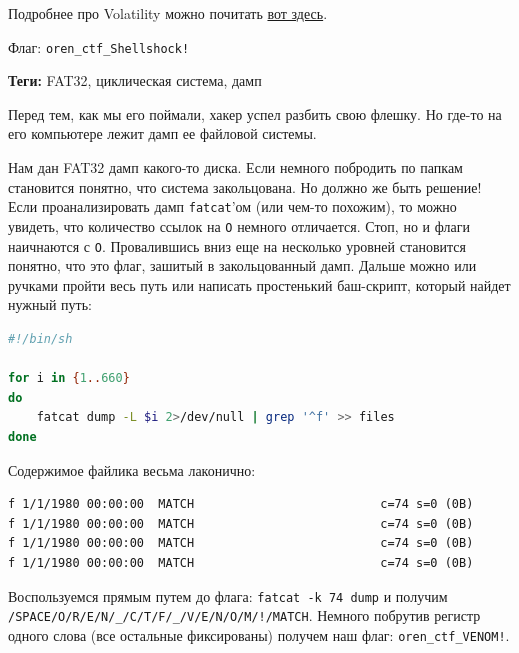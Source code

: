 \documentclass[idxtotoc,hyperref,openany,oneside]{files/forensics} %
\begin{document}
Подробнее про Volatility можно почитать \href{https://habr.com/ru/post/433248/}{вот здесь}.

Флаг: \verb|oren_ctf_Shellshock!|




\textbf{Теги:} FAT32, циклическая система, дамп\vspace{\baselineskip}

\begin{tcolorbox}
Перед тем, как мы его поймали, хакер успел разбить свою флешку. Но где-то на его компьютере лежит дамп ее файловой системы.
\end{tcolorbox}

Нам дан FAT32 дамп какого-то диска. Если немного побродить по папкам становится понятно, что система закольцована. Но должно же быть решение! Если проанализировать дамп \verb|fatcat|'ом (или чем-то похожим), то можно увидеть, что количество ссылок на \verb|O| немного отличается. Стоп, но и флаги наичнаются с \verb|O|. Провалившись вниз еще на несколько уровней становится понятно, что это флаг, зашитый в закольцованный дамп. Дальше можно или ручками пройти весь путь или написать простенький баш-скрипт, который найдет нужный путь:
\begin{lstlisting}[language=Bash]
#!/bin/sh

for i in {1..660}
do
    fatcat dump -L $i 2>/dev/null | grep '^f' >> files
done
\end{lstlisting}

Содержимое файлика весьма лаконично:
\begin{lstlisting}
f 1/1/1980 00:00:00  MATCH                          c=74 s=0 (0B)
f 1/1/1980 00:00:00  MATCH                          c=74 s=0 (0B)
f 1/1/1980 00:00:00  MATCH                          c=74 s=0 (0B)
f 1/1/1980 00:00:00  MATCH                          c=74 s=0 (0B)
\end{lstlisting}

Воспользуемся прямым путем до флага: \verb|fatcat -k 74 dump| и получим \newline \verb|/SPACE/O/R/E/N/_/C/T/F/_/V/E/N/O/M/!/MATCH|. Немного побрутив регистр одного слова (все остальные фиксированы) получем наш флаг: \verb|oren_ctf_VENOM!|.
\newpage


\end{document}
